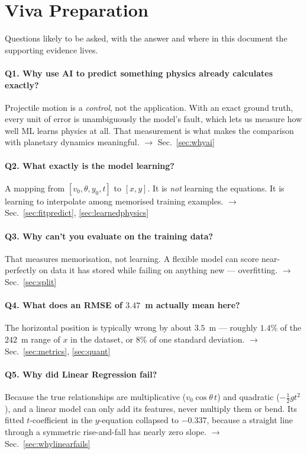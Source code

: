 \documentclass[11pt,a4paper]{article}
\newcommand{\vzero}{v_{0}}
\newcommand{\yzero}{y_{0}}
\begin{document}
\section{Viva Preparation}\label{app:viva}

Questions likely to be asked, with the answer and where in this document the supporting evidence
lives.

\paragraph{Q1. Why use AI to predict something physics already calculates exactly?}
Projectile motion is a \emph{control}, not the application. With an exact ground truth, every unit of
error is unambiguously the model's fault, which lets us measure how well ML learns physics at all.
That measurement is what makes the comparison with planetary dynamics meaningful.
$\rightarrow$ Sec.~\ref{sec:whyai}

\paragraph{Q2. What exactly is the model learning?}
A mapping from $[\vzero,\theta,\yzero,t]$ to $[x,y]$. It is \emph{not} learning the equations. It is
learning to interpolate among memorised training examples.
$\rightarrow$ Sec.~\ref{sec:fitpredict}, \ref{sec:learnedphysics}

\paragraph{Q3. Why can't you evaluate on the training data?}
That measures memorisation, not learning. A flexible model can score near-perfectly on data it has
stored while failing on anything new --- overfitting. $\rightarrow$ Sec.~\ref{sec:split}

\paragraph{Q4. What does an RMSE of $3.47$~m actually mean here?}
The horizontal position is typically wrong by about $3.5$~m --- roughly $1.4\%$ of the $242$~m range
of $x$ in the dataset, or $8\%$ of one standard deviation.
$\rightarrow$ Sec.~\ref{sec:metrics}, \ref{sec:quant}

\paragraph{Q5. Why did Linear Regression fail?}
Because the true relationships are multiplicative ($\vzero\cos\theta\,t$) and quadratic
($-\tfrac{1}{2}gt^{2}$), and a linear model can only add its features, never multiply them or bend.
Its fitted $t$-coefficient in the $y$-equation collapsed to $-0.337$, because a straight line through
a symmetric rise-and-fall has nearly zero slope. $\rightarrow$ Sec.~\ref{sec:whylinearfails}
\end{document}
